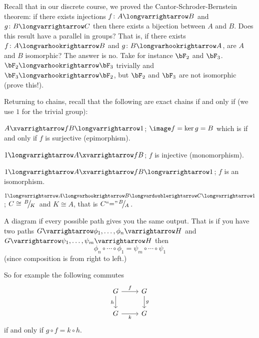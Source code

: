 \documentclass[10pt]{article}
\def\slfrac#1#2{\left.{}^{#1}\mkern-4mu\middle/\mkern-3mu{}_{#2}\right.}
\let\mmorph=\longvarhookrightarrow
\begin{document}


\bigskip

Recall that in our discrete course, we proved the Cantor-Schroder-Bernstein theorem: if there exists injections $f\colon A\longvarrightarrow B$ and $g\colon B\longvarrightarrow C$ then there exists
a bijection between $A$ and $B$.
Does this result have a parallel in groups?
That is, if there exists $f\colon A\mmorph B$ and $g\colon B\mmorph A$, are $A$ and $B$ isomorphic?
The answer is no.
Take for instance $\bF_2$ and $\bF_3$.
$\bF_2\mmorph\bF_3$ trivially and $\bF_3\mmorph\bF_2$, but $\bF_2$ and $\bF_3$ are not isomorphic (prove this!).

Returning to chains, recall that the following are exact chains if and only if (we use $1$ for the trivial group):
\benum
    \item $A\xvarrightarrow fB\longvarrightarrow 1$; $\image f=\ker g=B$ which is if and only if $f$ is surjective (epimorphism).
    \item $1\longvarrightarrow A\xvarrightarrow fB$; $f$ is injective (monomorphism).
    \item $1\longvarrightarrow A\xvarrightarrow fB\longvarrightarrow 1$; $f$ is an isomorphism.
    \item $1\longvarrightarrow A\mmorph B\longvardoublerightarrow C\longvarrightarrow 1$; $C\cong\slfrac BK$ and $K\cong A$, that is $C{\hbox{``$=$''}}\slfrac BA$.
\eenum

\begin{defn*}

    A diagram  if every possible path gives you the same output.
    That is if you have two paths $G\varrightarrow\phi_1,\dots,\phi_n\varrightarrow H$ and $G\varrightarrow\psi_1,\dots,\psi_m\varrightarrow H$ then
    \[ \phi_n\circ\cdots\circ\phi_1=\psi_m\circ\cdots\circ\psi_1 \]
    (since composition is from right to left.)

\end{defn*}

So for example the following commutes
\[\begin{tikzcd}
	G & G \\
	G & G
	\arrow["f", from=1-1, to=1-2]
	\arrow["g", from=1-2, to=2-2]
	\arrow["h"', from=1-1, to=2-1]
	\arrow["k"', from=2-1, to=2-2]
\end{tikzcd}\]
if and only if $g\circ f=k\circ h$.
\end{document}

